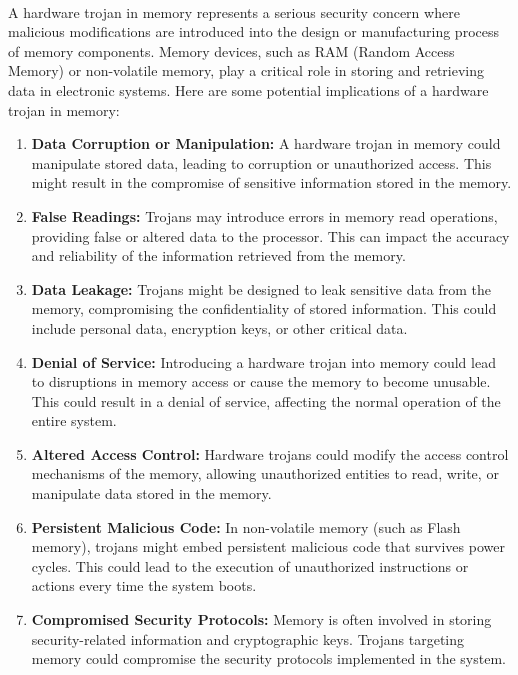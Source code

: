 \paragraph*{}
A hardware trojan in memory represents a serious security concern where malicious modifications are introduced into the design or manufacturing process of memory components. Memory devices, such as RAM (Random Access Memory) or non-volatile memory, play a critical role in storing and retrieving data in electronic systems. Here are some potential implications of a hardware trojan in memory:
\begin{enumerate}
	\item \textbf{Data Corruption or Manipulation:} A hardware trojan in memory could manipulate stored data, leading to corruption or unauthorized access. This might result in the compromise of sensitive information stored in the memory.
	\item \textbf{False Readings:} Trojans may introduce errors in memory read operations, providing false or altered data to the processor. This can impact the accuracy and reliability of the information retrieved from the memory.
	\item \textbf{Data Leakage:} Trojans might be designed to leak sensitive data from the memory, compromising the confidentiality of stored information. This could include personal data, encryption keys, or other critical data.
	\item \textbf{Denial of Service:} Introducing a hardware trojan into memory could lead to disruptions in memory access or cause the memory to become unusable. This could result in a denial of service, affecting the normal operation of the entire system.
	\item \textbf{Altered Access Control:} Hardware trojans could modify the access control mechanisms of the memory, allowing unauthorized entities to read, write, or manipulate data stored in the memory.
	\item \textbf{Persistent Malicious Code:} In non-volatile memory (such as Flash memory), trojans might embed persistent malicious code that survives power cycles. This could lead to the execution of unauthorized instructions or actions every time the system boots.
	\item \textbf{Compromised Security Protocols:} Memory is often involved in storing security-related information and cryptographic keys. Trojans targeting memory could compromise the security protocols implemented in the system.
\end{enumerate}
